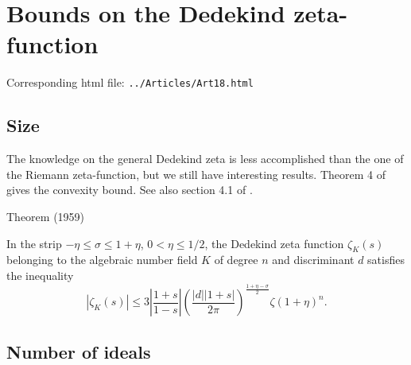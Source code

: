 \chapter{  Bounds on the Dedekind zeta-function}

Corresponding html file: \texttt{../Articles/Art18.html}










 
 


\par 
\section{Size }


The knowledge on the general Dedekind zeta is less accomplished than
the one of the Riemann zeta-function, but we still have interesting
results. Theorem 4 of \cite{Rademacher*59} gives
the convexity bound. See also section 4.1 of
\cite{Trudgian*13}.
\par 
\begin{thm}{Theorem (1959)}

In the strip $-\eta\le \sigma\le 1+\eta$, $0 < \eta\le 1/2$, the Dedekind zeta
function $\zeta_K(s)$ belonging to the algebraic number field $K$ of degree
$n$ and discriminant $d$ satisfies the inequality
$$
|\zeta_K(s)|\le 3 \left|\frac{1+s}{1-s}\right|
\left(\frac{|d||1+s|}{2\pi}\right)^{\frac{1+\eta-\sigma}{2}}
\zeta(1+\eta)^n.
$$
\end{thm}


\par 

\section{Number of ideals}


